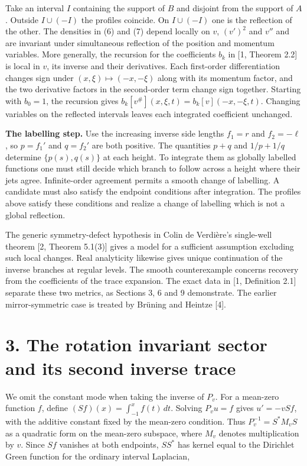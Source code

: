 \documentclass[11pt,letterpaper]{article}
\begin{document}
Take an interval \(I\) containing the support of \(B\) and disjoint from the support of
\(A\). Outside \(I\cup(-I)\) the profiles coincide. On \(I\cup(-I)\) one is the reflection
of the other. The densities in (6) and (7) depend locally on \(v\), \((v')^2\) and \(v''\)
and are invariant under simultaneous reflection of the position and momentum variables. More
generally, the recursion for the coefficients \(b_k\) in [1, Theorem 2.2] is local in
\(v\), its inverse and their derivatives. Each first-order differentiation changes sign
under \((x,\xi)\mapsto(-x,-\xi)\) along with its momentum factor, and the two derivative
factors in the second-order term change sign together. Starting with \(b_0=1\), the
recursion gives \(b_k[v^\#](x,\xi,t)=b_k[v](-x,-\xi,t)\). Changing variables on the
reflected intervals leaves each integrated coefficient unchanged.

\textbf{The labelling step.} Use the increasing inverse side lengths \(f_1=r\) and
\(f_2=-\ell\), so \(p=f_1'\) and \(q=f_2'\) are both positive. The quantities \(p+q\) and
\(1/p+1/q\) determine \(\{p(s),q(s)\}\) at each height. To integrate them as globally
labelled functions one must still decide which branch to follow across a height where their
jets agree. Infinite-order agreement permits a smooth change of labelling. A candidate must
also satisfy the endpoint conditions after integration. The profiles above satisfy these
conditions and realize a change of labelling which is not a global reflection.

The generic symmetry-defect hypothesis in Colin de Verdière's single-well theorem [2,
Theorem 5.1(3)] gives a model for a sufficient assumption excluding such local changes.
Real analyticity likewise gives unique continuation of the inverse branches at regular
levels. The smooth counterexample concerns recovery from the coefficients of the trace
expansion. The exact data in [1, Definition 2.1] separate these two metrics, as Sections
3, 6 and 9 demonstrate. The earlier mirror-symmetric case is treated by Brüning and Heintze
[4].

\section{3. The rotation invariant sector and its second inverse
trace}\label{the-rotation-invariant-sector-and-its-second-inverse-trace}

We omit the constant mode when taking the inverse of \(P_v\). For a mean-zero function
\(f\), define \((Sf)(x)=\int_{-1}^{x}f(t)\,dt\). Solving \(P_vu=f\) gives \(u'=-vSf\), with
the additive constant fixed by the mean-zero condition. Thus \(P_v^{-1}=S^*M_vS\) as a
quadratic form on the mean-zero subspace, where \(M_v\) denotes multiplication by \(v\).
Since \(Sf\) vanishes at both endpoints, \(SS^*\) has kernel equal to the Dirichlet Green
function for the ordinary interval Laplacian,
\end{document}
